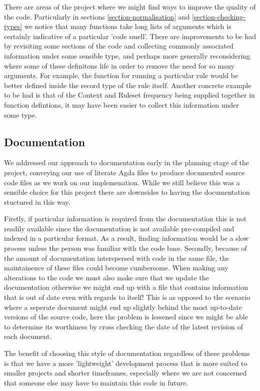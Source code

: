 There are areas of the project where we might find ways to
improve the quality of the code. Particularly in sections
\ref{section-normalisation} and \ref{section-checking-types} we notice
that many functions take long lists of arguments which is certainly
indicative of a particular 'code smell'. There are improvements to be
had by revisiting some sections of the code and collecting commonly
associated information under some sensible type, and perhaps more
generally reconsidering where some of these definitons life in order
to remove the need for so many arguments. For example, the function
for running a particular rule would be better defined inside the
record type of the rule itself. Another concrete example to be had is
that of the Context and Ruleset frequency being supplied together in
function defintions, it may have been easier to collect this
information under some type.

\subsection{Documentation}

We addressed our approach to documentation early in the planning stage
of the project, conveying our use of literate Agda files to produce
documented source code files as we work on our implemenation. While we
still believe this was a sensible choice for this project there are
downsides to having the documentation stuctured in this way.

Firstly, if particular information is required from the documentation
this is not readily available since the documentation is not available
pre-compiled and indexed in a particular format. As a result, finding
information would be a slow process unless the person was familiar
with the code base. Secondly, because of the amount of documentation
interspersed with code in the same file, the maintainence of these
files could become cumbersome. When making any alterations to the code
we must also make sure that we update the documentation otherwise we
might end up with a file that contains information that is out of date
even with regards to itself! This is as opposed to the scenario where a
seperate document might end up slightly behind the most up-to-date
versions of the source code, here the problem is lessened since we
might be able to determine its worthiness by cross checking the date
of the latest revision of each document.

The benefit of choosing this style of documentation regardless of
these problems is that we have a more 'lightweight' development
process that is more suited to smaller projects and shorter
timeframes, especially where we are not concerned that someone else
may have to maintain this code in future.


